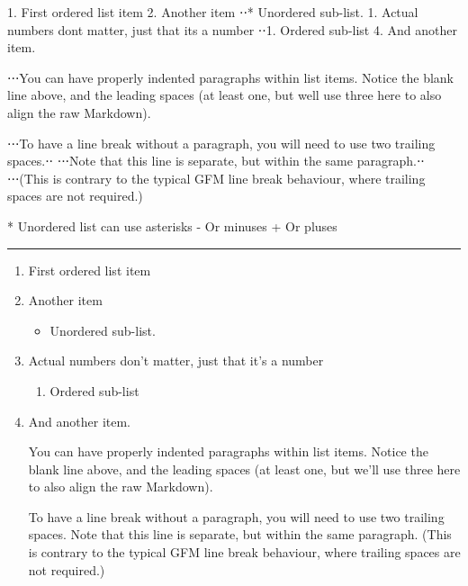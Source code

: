 \documentclass[
]{article}
\newenvironment{Shaded}{}{}
\newcommand{\NormalTok}[1]{#1}
\providecommand{\tightlist}{%
  \setlength{\itemsep}{0pt}\setlength{\parskip}{0pt}}
\begin{document}
\begin{Shaded}
\begin{Highlighting}[]
\NormalTok{1. First ordered list item}
\NormalTok{2. Another item}
\NormalTok{⋅⋅* Unordered sub{-}list.}
\NormalTok{1. Actual numbers don\textquotesingle{}t matter, just that it\textquotesingle{}s a number}
\NormalTok{⋅⋅1. Ordered sub{-}list}
\NormalTok{4. And another item.}

\NormalTok{⋅⋅⋅You can have properly indented paragraphs within list items. Notice the blank line above, and the leading spaces (at least one, but we\textquotesingle{}ll use three here to also align the raw Markdown).}

\NormalTok{⋅⋅⋅To have a line break without a paragraph, you will need to use two trailing spaces.⋅⋅}
\NormalTok{⋅⋅⋅Note that this line is separate, but within the same paragraph.⋅⋅}
\NormalTok{⋅⋅⋅(This is contrary to the typical GFM line break behaviour, where trailing spaces are not required.)}

\NormalTok{* Unordered list can use asterisks}
\NormalTok{{-} Or minuses}
\NormalTok{+ Or pluses}
\end{Highlighting}
\end{Shaded}

\begin{center}\rule{0.5\linewidth}{0.5pt}\end{center}

\begin{enumerate}
\def\labelenumi{\arabic{enumi}.}
\item
  First ordered list item
\item
  Another item

  \begin{itemize}
  \tightlist
  \item
    Unordered sub-list.
  \end{itemize}
\item
  Actual numbers don't matter, just that it's a number

  \begin{enumerate}
  \def\labelenumii{\arabic{enumii}.}
  \tightlist
  \item
    Ordered sub-list
  \end{enumerate}
\item
  And another item.

  You can have properly indented paragraphs within list items. Notice
  the blank line above, and the leading spaces (at least one, but we'll
  use three here to also align the raw Markdown).

  To have a line break without a paragraph, you will need to use two
  trailing spaces. Note that this line is separate, but within the same
  paragraph. (This is contrary to the typical GFM line break behaviour,
  where trailing spaces are not required.)
\end{enumerate}
\end{document}

